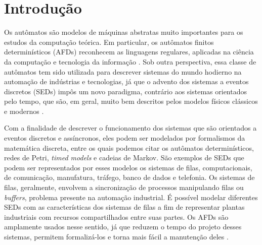 \chapter{Introdução}

Os autômatos são modelos de máquinas abstratas muito importantes para os estudos da computação teórica. Em particular, os autômatos finitos determinísticos (\acs{AFD}s) reconhecem as linguagens regulares, aplicadas na ciência da computação e tecnologia da informação \cite{hopcroft}. Sob outra perspectiva, essa classe de autômatos tem sido utilizada para descrever sistemas do mundo hodierno na automação de indústrias e tecnologias, já que o advento dos sistemas a eventos discretos (\acs{SED}s) impôs um novo paradigma, contrário aos sistemas orientados pelo tempo, que são, em geral, muito bem descritos pelos modelos físicos clássicos e modernos \cite{cassandras}.

Com a finalidade de descrever o funcionamento dos sistemas que são orientados a eventos discretos e assíncronos, eles podem ser modelados por formalismos da matemática discreta, entre os quais podemos citar os autômatos determinísticos, redes de Petri, \textit{timed models} e cadeias de Markov. São exemplos de SEDs que podem ser representados por esses modelos os sistemas de filas, computacionais, de comunicação, manufatura, tráfego, banco de dados e telefonia. Os sistemas de filas, geralmente, envolvem a sincronização de processos manipulando filas ou \textit{buffers}, problema presente na automação industrial. É possível modelar diferentes SEDs com as características dos sistemas de filas a fim de representar plantas industriais com recursos compartilhados entre suas partes. Os AFDs são amplamente usados nesse sentido, já que reduzem o tempo do projeto desses sistemas, permitem formalizá-los e torna mais fácil a manutenção deles \cite{rosso1}.

